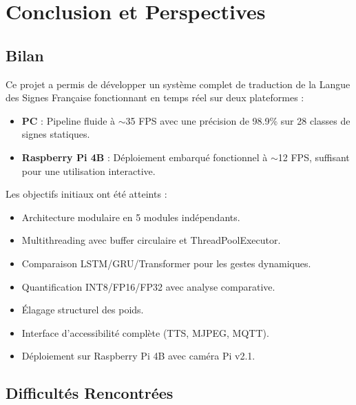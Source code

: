 \chapter{Conclusion et Perspectives}

\section{Bilan}

Ce projet a permis de développer un système complet de traduction de la Langue des Signes Française fonctionnant en temps réel sur deux plateformes :

\begin{itemize}
    \item \textbf{PC} : Pipeline fluide à $\sim$35 FPS avec une précision de 98.9\% sur 28 classes de signes statiques.
    \item \textbf{Raspberry Pi 4B} : Déploiement embarqué fonctionnel à $\sim$12 FPS, suffisant pour une utilisation interactive.
\end{itemize}

Les objectifs initiaux ont été atteints :
\begin{itemize}
    \item[$\checkmark$] Architecture modulaire en 5 modules indépendants.
    \item[$\checkmark$] Multithreading avec buffer circulaire et ThreadPoolExecutor.
    \item[$\checkmark$] Comparaison LSTM/GRU/Transformer pour les gestes dynamiques.
    \item[$\checkmark$] Quantification INT8/FP16/FP32 avec analyse comparative.
    \item[$\checkmark$] Élagage structurel des poids.
    \item[$\checkmark$] Interface d'accessibilité complète (TTS, MJPEG, MQTT).
    \item[$\checkmark$] Déploiement sur Raspberry Pi 4B avec caméra Pi v2.1.
\end{itemize}

\section{Difficultés Rencontrées}


